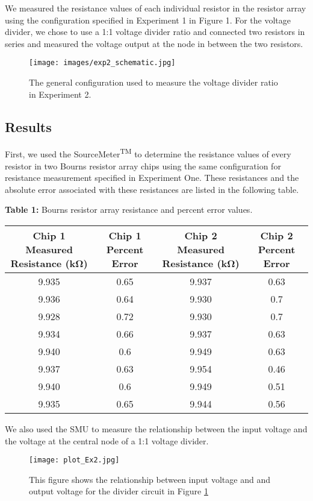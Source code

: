 \documentclass{article}
\begin{document}
We measured the resistance values of each individual resistor in the resistor array using the configuration specified in Experiment 1 in Figure 1. For the voltage divider, we chose to use a 1:1 voltage divider ratio and connected two resistors in series and measured the voltage output at the node in between the two resistors.
\begin{figure}[H]   
  \centering        
  \texttt{[image: images/exp2\_schematic.jpg]}
  \caption{The general configuration used to measure the voltage divider ratio in Experiment 2.}
  \label{fig:exp2}
\end{figure}

\subsection{Results}
First, we used the SourceMeter\textsuperscript{TM} to determine the resistance values of every resistor in two Bourns resistor array chips using the same configuration for resistance measurement specified in Experiment One. These resistances and the absolute error associated with these resistances are listed in the following table. 
\begin{center}
\small\addtolength{\tabcolsep}{-5pt}
    \textbf{Table 1:} Bourns resistor array resistance and percent error values.
    \begin{tabular}{|c|c|c|c|}
        \hline
        Chip 1 Measured Resistance (kΩ) & Chip 1 Percent Error &
        Chip 2 Measured Resistance (kΩ) & Chip 2 Percent Error \\ \hline
        9.935 & 0.65 & 9.937 & 0.63 \\ \hline
        9.936 & 0.64 & 9.930 & 0.7 \\ \hline
        9.928 & 0.72 & 9.930 & 0.7 \\ \hline
        9.934 & 0.66 & 9.937 & 0.63 \\ \hline
        9.940 & 0.6 & 9.949 & 0.63 \\ \hline
        9.937 & 0.63 & 9.954 & 0.46 \\ \hline
        9.940 & 0.6 & 9.949 & 0.51 \\ \hline
        9.935 & 0.65 & 9.944 & 0.56 \\ \hline
    \end{tabular}
\end{center}

We also used the SMU to measure the relationship between the input voltage and the voltage at the central node of a 1:1 voltage divider.
\begin{figure}[H]
    \centering
    \texttt{[image: plot\_Ex2.jpg]}
    \caption{This figure shows the relationship between input voltage and and output voltage for the divider circuit in Figure \ref{fig:exp2}}
    \label{fig:ramp}
\end{figure}
\end{document}

